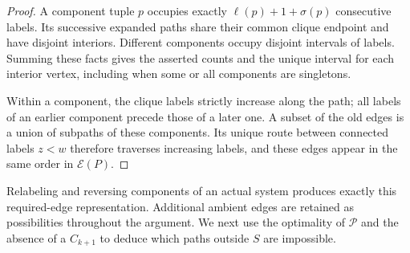 \begin{proof}
A component tuple $p$ occupies exactly
$\ell(p)+1+\sigma(p)$ consecutive labels.  Its successive expanded
paths share their common clique endpoint and have disjoint interiors.
Different components occupy disjoint intervals of labels.  Summing
these facts gives the asserted counts and the unique interval for
each interior vertex, including when some or all components are
singletons.

Within a component, the clique labels strictly increase along the
path; all labels of an earlier component precede those of a later
one.  A subset of the old edges is a union of subpaths of these
components.  Its unique route between connected labels $z<w$
therefore traverses increasing labels, and these edges appear in
the same order in $\mathcal E(P)$.
\end{proof}

Relabeling and reversing components of an actual system produces
exactly this required-edge representation.  Additional ambient
edges are retained as possibilities throughout the argument.  We
next use the optimality of $\mathcal P$ and the absence of a
$C_{k+1}$ to deduce which paths outside $S$ are impossible.
